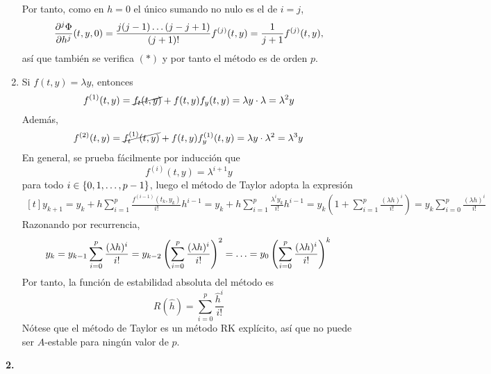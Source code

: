 \documentclass[11pt]{report}
\begin{document}
\begin{enumerate}
    Por tanto, como en $h=0$ el único sumando no nulo es el de $i=j$, 
    \[\frac{\partial^j \Phi}{\partial h^j} (t,y,0)=\frac{j(j-1)\mathellipsis(j-j+1)}{(j+1)!}f^{(j)}(t,y) =  \frac{1}{j+1}f^{(j)}(t,y),\]
    así que también se verifica $(\ast)$ y por tanto el método es de orden $p$.
    \item Si $f(t,y)=\lambda y$, entonces
    \[f^{(1)}(t,y)=\cancel{f_t(t,y)}+f(t,y)f_y(t,y) = \lambda y \cdot \lambda = \lambda^2y\] 
    Además,
    \[f^{(2)}(t,y)=\cancel{f^{(1)}_t(t,y)}+f(t,y)f^{(1)}_y(t,y) =\lambda y \cdot \lambda^2 = \lambda^3y\]
    En general, se prueba fácilmente por inducción que
    \[f^{(i)}(t,y) = \lambda^{i+1}y\]
    para todo $i \in \{0,1,\mathellipsis,p-1\}$, luego el método de Taylor adopta la expresión
    \[
    \begin{aligned}[t]
    y_{k+1} = y_k+h\sum_{i=1}^p \frac{f^{(i-1)}(t_k,y_k)}{i!}h^{i-1} = y_k+h\sum_{i=1}^p \frac{\lambda^iy_k}{i!}h^{i-1} = y_k\left(1+\sum_{i=1}^p \frac{(\lambda h)^i}{i!}\right) = y_k\sum_{i=0}^p\frac{(\lambda h)^i}{i!}
    \end{aligned}
    \]
    Razonando por recurrencia,
    \[y_{k} = y_{k-1}\sum_{i=0}^p\frac{(\lambda h)^i}{i!}=y_{k-2}\left(\sum_{i=0}^p\frac{(\lambda h)^i}{i!}\right)^2 = \mathellipsis =y_0\left(\sum_{i=0}^p\frac{(\lambda h)^i}{i!}\right)^{k}\]
    Por tanto, la función de estabilidad absoluta del método es
    \[R(\hat{h}) = \sum_{i=0}^p \frac{\hat{h}^i}{i!}\]
    Nótese que el método de Taylor es un método RK explícito, así que no puede ser $A$-estable para ningún valor de $p$.
\end{enumerate}

\textbf{2.}
\end{document}
